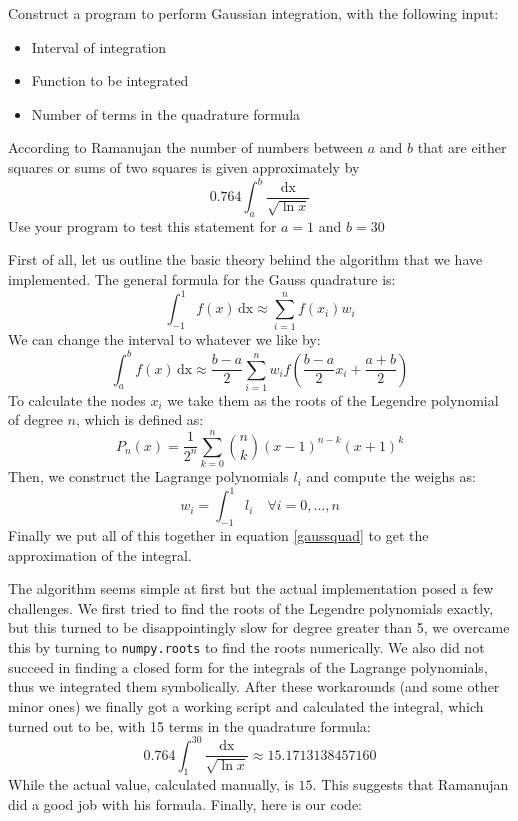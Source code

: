 \begin{problem}
Construct a program to perform Gaussian integration, with the following input:
\begin{itemize}
\item Interval of integration
\item Function to be integrated
\item Number of terms in the quadrature formula
\end{itemize}
According to Ramanujan the number of numbers between $a$ and $b$ that
are either squares or sums of two squares is given approximately by
\begin{equation*}
0.764\int_a^b \frac{\text{dx}}{\sqrt{\ln x}}
\end{equation*}
Use your program to test this statement for $a=1$ and $b=30$
\end{problem}

\begin{solution}
  First of all, let us outline the basic theory behind the algorithm
  that we have implemented. The general formula for the Gauss
  quadrature is:
\begin{equation*}
\int_{-1}^1 f(x) \, \text{dx} \approx \sum_{i=1}^n f(x_i)w_i
\end{equation*}
We can change the interval to whatever we like by:
\begin{equation}
  \int_a^b f(x) \, \text{dx} \approx \frac{b-a}{2} \sum_{i=1}^n w_i f\left(\frac{b-a}{2}x_i+\frac{a+b}{2}\right)
\label{gaussquad}
\end{equation}
To calculate the nodes $x_i$ we take them as the roots of the Legendre
polynomial of degree $n$, which is defined as:
\begin{equation*}
P_n(x) = \frac{1}{2^n} \sum_{k=0}^n \binom{n}{k} (x-1)^{n-k}(x+1)^k
\end{equation*}
Then, we construct the Lagrange polynomials $l_i$ and compute the
weighs as:
\begin{equation*}
w_i = \int_{-1}^1 l_i \quad \forall i = 0, \ldots, n
\end{equation*}
Finally we put all of this together in equation \ref{gaussquad} to get
the approximation of the integral.

The algorithm seems simple at first but the actual implementation
posed a few challenges. We first tried to find the roots of the
Legendre polynomials exactly, but this turned to be disappointingly
slow for degree greater than 5, we overcame this by turning to
\texttt{numpy.roots} to find the roots numerically. We also did not
succeed in finding a closed form for the integrals of the Lagrange
polynomials, thus we integrated them symbolically. After these
workarounds (and some other minor ones) we finally got a working
script and calculated the integral, which turned out to be, with 15
terms in the quadrature formula:
\begin{equation*}
0.764 \int_1^{30} \frac{\text{dx}}{\sqrt{\ln x}} \approx 15.1713138457160
\end{equation*}
While the actual value, calculated manually, is $15$. This suggests
that Ramanujan did a good job with his formula. Finally, here is our
code: 
\end{solution}
\newpage


